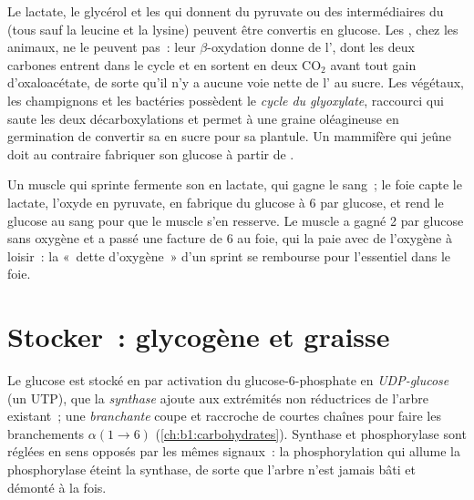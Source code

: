\begin{proposition}\label{prop:b1:biosyntheses-integration:cannot}
Le lactate, le glycérol et les  qui donnent du pyruvate ou
des intermédiaires du  (tous sauf la leucine et la lysine)
peuvent être convertis en glucose. Les , chez les animaux, ne
le peuvent pas~: leur $\beta$-oxydation donne de l', dont les
deux carbones entrent dans le cycle et en sortent en deux
$\mathrm{CO_2}$ avant tout gain d'oxaloacétate, de sorte qu'il n'y a
aucune voie nette de l' au sucre. Les végétaux, les
champignons et les bactéries possèdent le \emph{cycle du glyoxylate},
raccourci qui saute les deux décarboxylations et permet à une graine
oléagineuse en germination de convertir sa  en sucre pour sa
plantule. Un mammifère qui jeûne doit au contraire fabriquer son glucose
à partir de .
\end{proposition}

\begin{example}\label{ex:b1:biosyntheses-integration:cori}
Un muscle qui sprinte fermente son  en lactate, qui gagne le
sang~; le foie capte le lactate, l'oxyde en pyruvate, en fabrique du
glucose à 6  par glucose, et rend le glucose au sang pour que le
muscle s'en resserve. Le muscle a gagné 2  par glucose sans oxygène
et a passé une facture de 6 au foie, qui la paie avec de l'oxygène à
loisir~: la «~dette d'oxygène~» d'un sprint se rembourse pour
l'essentiel dans le foie.
\end{example}

\section{Stocker~: glycogène et graisse}

\begin{definition}\label{def:b1:biosyntheses-integration:glycogensynthesis}
Le glucose est stocké en  par activation du
glucose-6-phosphate en \emph{UDP-glucose} (un UTP), que la
\emph{ synthase} ajoute aux extrémités non réductrices de
l'arbre existant~; une \emph{ branchante} coupe et raccroche de
courtes chaînes pour faire les branchements $\alpha(1{\to}6)$
(\cref{ch:b1:carbohydrates}). Synthase et phosphorylase sont réglées en
sens opposés par les mêmes signaux~: la phosphorylation qui allume la
phosphorylase éteint la synthase, de sorte que l'arbre n'est jamais bâti
et démonté à la fois.
\end{definition}

